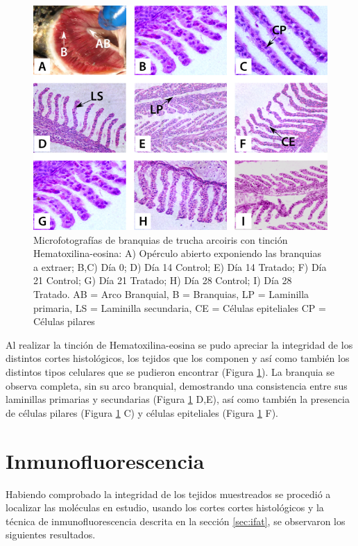 \documentclass[12pt,letterpaper,oneside]{scrbook}
\begin{document}
\begin{figure}[h!]
    \centering
\includegraphics[width=1\textwidth]{gills}
    \caption[Microfotografías de branquias de trucha arcoiris]{Microfotografías de branquias de trucha arcoiris con tinción Hematoxilina-eosina: A) Opérculo abierto exponiendo las branquias a extraer; B,C) Día 0; D) Día 14 Control; E) Día 14 Tratado; F) Día 21 Control; G) Día 21 Tratado; H) Día 28 Control; I) Día 28 Tratado. AB = Arco Branquial, B = Branquias, LP = Laminilla primaria, LS = Laminilla secundaria, CE = Células epiteliales CP = Células pilares}
    \label {fig:gills}
\end{figure}

Al realizar la tinción de Hematoxilina-eosina se pudo apreciar la
integridad de los distintos cortes histológicos, los tejidos que los
componen y así como también los distintos tipos celulares que se
pudieron encontrar (Figura \ref{fig:gills}). La branquia se observa
completa, sin su arco branquial, demostrando una consistencia entre sus
laminillas primarias y secundarias (Figura \ref{fig:gills} D,E), así
como también la presencia de células pilares (Figura \ref{fig:gills} C)
y células epiteliales (Figura \ref{fig:gills} F).

\section{Inmunofluorescencia}

Habiendo comprobado la integridad de los tejidos muestreados se procedió
a localizar las moléculas en estudio, usando los cortes cortes
histológicos y la técnica de inmunofluorescencia descrita en la sección
\ref{sec:ifat}, se observaron los siguientes resultados.
\end{document}

